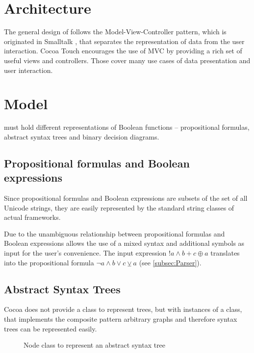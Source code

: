 
\section{Architecture}

The general design of \Nyaya follows the Model-View-Controller pattern,
which is originated in Smalltalk \cite[p.4]{GAMMAETAL}, 
that separates the representation of data from the user interaction.
Cocoa Touch  encourages the use of MVC by providing a rich set of useful views and controllers.
Those cover many use cases of data presentation and user interaction.

\section{Model}

\Nyaya must hold different representations of Boolean functions – propositional formulas, abstract syntax trees and binary decision diagrams. 

\subsection{Propositional formulas and Boolean expressions}
Since propositional formulas and Boolean expressions are subsets of the set of all Unicode strings,
they are easily represented by the standard string classes of actual frameworks. 

Due to the unambiguous relationship between propositional formulas and Boolean expressions 
\Nyaya allows the use of a mixed syntax and additional symbols as input
for the user's convenience. The input expression $!a \wedge b + c \oplus a$ translates into the propositional formula
$\neg a \wedge b \vee c \veebar a$ (see \vref{subsec:Parser}).

\subsection{Abstract Syntax Trees}

Cocoa does not provide a class to represent trees, 
but with instances of a class, 
that implements the composite pattern \cite[p.163ff]{GAMMAETAL}
arbitrary graphs and therefore syntax trees can be represented easily.

\begin{figure}[htbp]
\begin{center}
\caption{Node class to represent an abstract syntax tree}
\label{fig:NyayaNodeCluster}
\end{center}
\end{figure}

